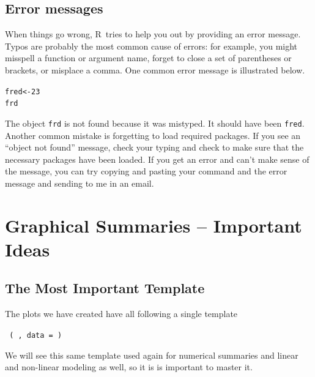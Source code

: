 \documentclass[twoside]{book}\usepackage[]{graphicx}\usepackage[]{xcolor}
\makeatletter
\newcommand{\hlnum}[1]{\textcolor[rgb]{0.686,0.059,0.569}{#1}}%
\newcommand{\hlstd}[1]{\textcolor[rgb]{0.345,0.345,0.345}{#1}}%
\newcommand{\hlkwb}[1]{\textcolor[rgb]{0.69,0.353,0.396}{#1}}%
\newenvironment{kframe}{%
 \def\at@end@of@kframe{}%
 \ifinner\ifhmode%
  \def\at@end@of@kframe{\end{minipage}}%
  \begin{minipage}{\columnwidth}%
 \fi\fi%
 \def\FrameCommand##1{\hskip\@totalleftmargin \hskip-\fboxsep
 \colorbox{shadecolor}{##1}\hskip-\fboxsep
     \hskip-\linewidth \hskip-\@totalleftmargin \hskip\columnwidth}%
 \MakeFramed {\advance\hsize-\width
   \@totalleftmargin\z@ \linewidth\hsize
   \@setminipage}}%
 {\par\unskip\endMakeFramed%
 \at@end@of@kframe}
\newenvironment{knitrout}{}{} %
\renewcommand{\code}[1]{{\color{blue!80!black}\texttt{#1}}}
\def\R{{\sf R}}
\newcounter{example}[section]
\makeatother
\begin{document}
\subsection{Error messages}
When things go wrong, \R\ tries to help you out by providing an error message.
Typos are probably the most common cause of errors: for example, you might
misspell a function or argument name, forget to close a set of parentheses or 
brackets, or misplace a comma.  
One common error message is illustrated below.
\begin{knitrout}
\color{fgcolor}\begin{kframe}
\begin{alltt}
\hlstd{fred} \hlkwb{<-} \hlnum{23}
\hlstd{frd}
\end{alltt}


{\ttfamily\noindent\bfseries\color{errorcolor}{\#\# Error in eval(expr, envir, enclos): object 'frd' not found}}\end{kframe}
\end{knitrout}
The object \code{frd} is not found because it was mistyped.  It should have
been \code{fred}.  Another common mistake is forgetting to load required packages.
If you see an ``object not found'' message, check your
typing and check to make sure that the necessary packages have been loaded.
If you get an error and can't make sense of the message, you can try copying and pasting your
command and the error message and sending to me in an email. 

\section{Graphical Summaries -- Important Ideas}

\subsection{The Most Important Template}

The plots we have created have all following a single template

\begin{center}
	\Large 
	\texttt{  ( , data =  ) }
\end{center}
We will see this same template used again for numerical summaries and linear and non-linear 
modeling as well, so it is is important to master it.
\end{document}
